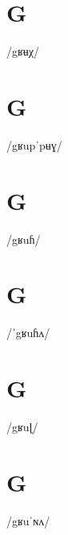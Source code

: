 \documentclass[10pt,a4paper,twoside]{book}
\begin{document}
\section*{G}

\begin{multicols}{3}
 {/gʁʉχ/} {}
\end{multicols}

\section*{G}

\begin{multicols}{3}
 {/gʁupˈpʉɣ/} {}
\end{multicols}

\section*{G}

\begin{multicols}{3}
 {/gʁuɦ/} {}
\end{multicols}

\section*{G}

\begin{multicols}{3}
 {/ˈgʁuɦʌ/} {}
\end{multicols}

\section*{G}

\begin{multicols}{3}
 {/gʁuɭ/} {}
\end{multicols}

\section*{G}

\begin{multicols}{3}
 {/gʁuˈɴʌ/} {}
\end{multicols}
\end{document}
